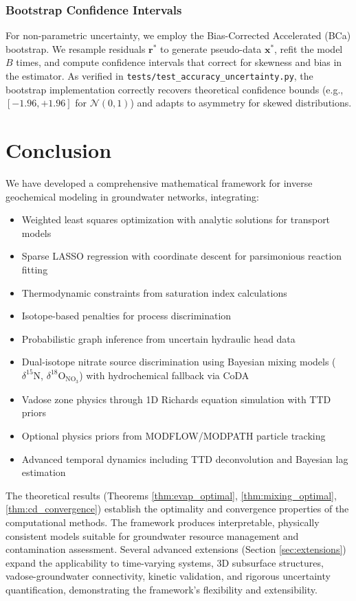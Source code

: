 \documentclass[12pt,a4paper]{article}
\theoremstyle{plain}
\theoremstyle{definition}
\theoremstyle{remark}
\begin{document}
\subsubsection{Bootstrap Confidence Intervals}

For non-parametric uncertainty, we employ the Bias-Corrected Accelerated (BCa) bootstrap. We resample residuals $\mathbf{r}^*$ to generate pseudo-data $\mathbf{x}^*$, refit the model $B$ times, and compute confidence intervals that correct for skewness and bias in the estimator. As verified in \texttt{tests/test\_accuracy\_uncertainty.py}, the bootstrap implementation correctly recovers theoretical confidence bounds (e.g., $[-1.96, +1.96]$ for $\mathcal{N}(0,1)$) and adapts to asymmetry for skewed distributions.
\newpage
\section{Conclusion}\label{sec:conclusion}

We have developed a comprehensive mathematical framework for inverse geochemical modeling in groundwater networks, integrating:
\begin{itemize}
	\item Weighted least squares optimization with analytic solutions for transport models
	\item Sparse LASSO regression with coordinate descent for parsimonious reaction fitting
	\item Thermodynamic constraints from saturation index calculations
	\item Isotope-based penalties for process discrimination
	\item Probabilistic graph inference from uncertain hydraulic head data
	\item Dual-isotope nitrate source discrimination using Bayesian mixing models ($\delta^{15}\text{N}$, $\delta^{18}\text{O}_{\text{NO}_3}$) with hydrochemical fallback via CoDA
	\item Vadose zone physics through 1D Richards equation simulation with TTD priors
	\item Optional physics priors from MODFLOW/MODPATH particle tracking
	\item Advanced temporal dynamics including TTD deconvolution and Bayesian lag estimation
\end{itemize}

The theoretical results (Theorems \ref{thm:evap_optimal}, \ref{thm:mixing_optimal}, \ref{thm:cd_convergence}) establish the optimality and convergence properties of the computational methods. The framework produces interpretable, physically consistent models suitable for groundwater resource management and contamination assessment. Several advanced extensions (Section \ref{sec:extensions}) expand the applicability to time-varying systems, 3D subsurface structures, vadose-groundwater connectivity, kinetic validation, and rigorous uncertainty quantification, demonstrating the framework's flexibility and extensibility.
\end{document}
